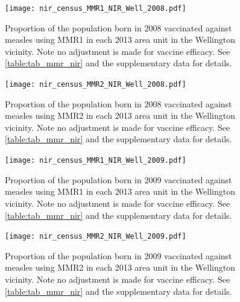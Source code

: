 \documentclass{article}
\begin{document}
% 
\begin{figure}
\begin{center}
    \texttt{[image: nir\_census\_MMR1\_NIR\_Well\_2008.pdf]}
\end{center}
    \caption{Proportion of the population born in 2008 vaccinated against measles using MMR1 in each 2013 area unit in the Wellington vicinity. Note no adjustment is made for vaccine efficacy. See \autoref{table:tab_mmr_nir} and the supplementary data for details.}
\label{fig:fig12008_w}
\end{figure}
% 
% 
\begin{figure}
\begin{center}
    \texttt{[image: nir\_census\_MMR2\_NIR\_Well\_2008.pdf]}
 \end{center}
    \caption{Proportion of the population born in 2008 vaccinated against measles using MMR2 in each 2013 area unit in the Wellington vicinity. Note no adjustment is made for vaccine efficacy. See \autoref{table:tab_mmr_nir} and the supplementary data for details.}
\label{fig:fig22008_w}
\end{figure}


\begin{figure}
\begin{center}
    \texttt{[image: nir\_census\_MMR1\_NIR\_Well\_2009.pdf]}
 \end{center}
    \caption{Proportion of the population born in 2009 vaccinated against measles using MMR1 in each 2013 area unit in the Wellington vicinity. Note no adjustment is made for vaccine efficacy. See \autoref{table:tab_mmr_nir} and the supplementary data for details.}
\label{fig:fig12009_w}
\end{figure}


\begin{figure}
\begin{center}
    \texttt{[image: nir\_census\_MMR2\_NIR\_Well\_2009.pdf]}
 \end{center}
    \caption{Proportion of the population born in 2009 vaccinated against measles using MMR2 in each 2013 area unit in the Wellington vicinity. Note no adjustment is made for vaccine efficacy. See \autoref{table:tab_mmr_nir} and the supplementary data for details.}
\label{fig:fig22009_w}
\end{figure}
\end{document}
